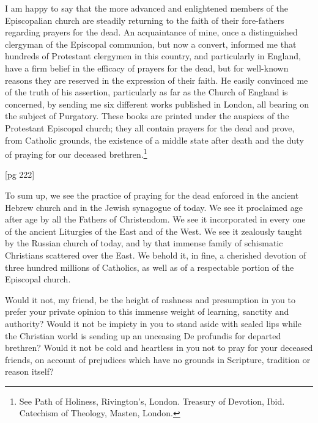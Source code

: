 I am happy to say that the more advanced and
enlightened members of the Episcopalian church
are steadily returning to the faith of their fore-fathers
regarding prayers for the dead. An acquaintance
of mine, once a distinguished clergyman
of the Episcopal communion, but now a convert,
informed me that hundreds of Protestant
clergymen in this country, and particularly in
England, have a firm belief in the efficacy of prayers
for the dead, but for well-known reasons they
are reserved in the expression of their faith. He
easily convinced me of the truth of his assertion,
particularly as far as the Church of England is
concerned, by sending me six different works published
in London, all bearing on the subject of
Purgatory. These books are printed under the auspices
of the Protestant Episcopal church; they all
contain prayers for the dead and prove, from Catholic
grounds, the existence of a middle state after
death and the duty of praying for our deceased
brethren.\footnote{See Path of Holiness,
Rivington's, London. Treasury of Devotion, Ibid.
Catechism of Theology, Masten, London.}

[pg 222]

To sum up, we see the practice of praying for
the dead enforced in the ancient Hebrew church
and in the Jewish synagogue of today. We see it
proclaimed age after age by all the Fathers of
Christendom. We see it incorporated in every
one of the ancient Liturgies of the East and of the
West. We see it zealously taught by the Russian
church of today, and by that immense family of
schismatic Christians scattered over the East. We
behold it, in fine, a cherished devotion of three hundred
millions of Catholics, as well as of a respectable
portion of the Episcopal church.

Would it not, my friend, be the height of rashness
and presumption in you to prefer your private
opinion to this immense weight of learning,
sanctity and authority? Would it not be impiety
in you to stand aside with sealed lips while the
Christian world is sending up an unceasing De
profundis for departed brethren? Would it not
be cold and heartless in you not to pray for your
deceased friends, on account of prejudices which
have no grounds in Scripture, tradition or reason
itself?

